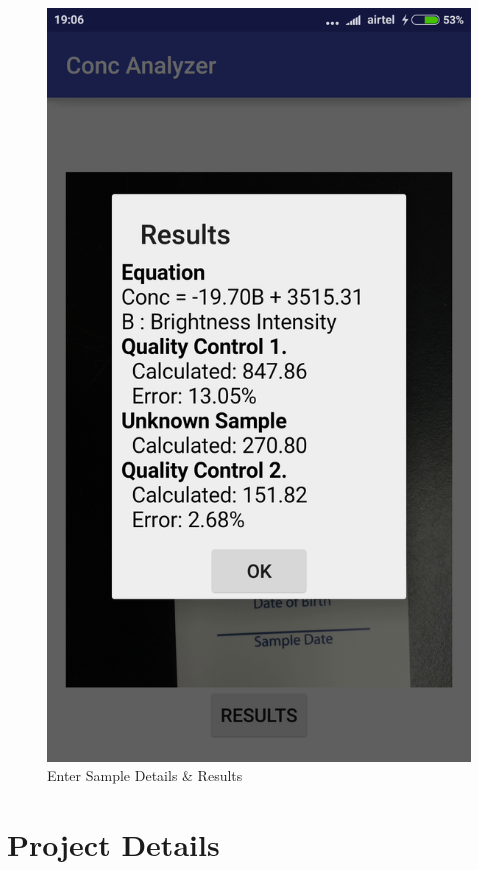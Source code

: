 \documentclass[runningheads,a4paper]{llncs}
\begin{document}
\begin{figure}[h!]
\begin{center}
\includegraphics[scale=0.11]{conc6}
\caption{Enter Sample Details \& Results}
\label{fig:scr3}
\end{center}
\end{figure}

\newpage

\section{Project Details}
\end{document}
